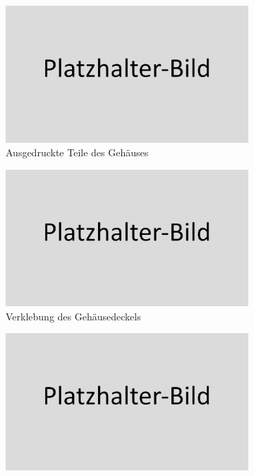 \begin{figure}[h!tb]
	\begin{subfigure}[b]{0.5\linewidth}
		\centering
		\includegraphics[width=1\textwidth]{img/placeholder.png}
		\caption[Ausgedruckte Teile des Gehäuses]{Ausgedruckte Teile des Gehäuses}
		\label{fig:printet_parts}
	\end{subfigure}
	\begin{subfigure}[b]{0.5\linewidth}
		\centering
		\includegraphics[width=1\textwidth]{img/placeholder.png}
		\caption[Verklebung des Gehäusedeckels]{Verklebung des Gehäusedeckels}
		\label{fig:glued_parts_01}
	\end{subfigure}
	\begin{subfigure}[b]{0.5\linewidth}
		\centering
		\includegraphics[width=1\textwidth]{img/placeholder.png}

\end{subfigure}
\end{figure}
